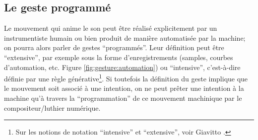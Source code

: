 \subsection{Le geste programmé}
\label{sec:gesture:instrumental_to_musical:geste_programme}

\noindent Le mouvement qui anime le son peut être réalisé explicitement par un instrumentiste humain ou bien produit de manière automatisée par la machine; on pourra alors parler de gestes ``programmés''. Leur définition peut être ``extensive'', par exemple sous la forme d'enregistrements (samples, courbes d'automation, etc. Figure \ref{fig:gesture:automation}) ou ``intensive'', c'est-à-dire définie par une règle générative\footnote{Sur les notions de notation ``intensive'' et ``extensive'', voir Giavitto \cite{giavitto_du_2014}.}. Si toutefois la définition du geste implique que le mouvement soit associé à une intention, on ne peut prêter une intention à la machine qu'à travers la ``programmation'' de ce mouvement machinique par le compositeur/luthier numérique.\\
